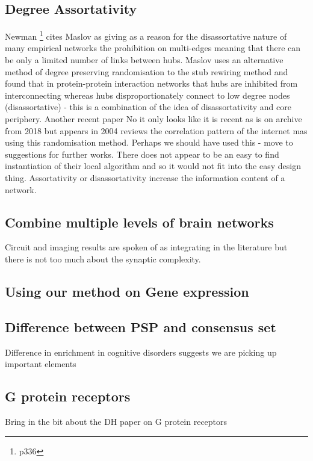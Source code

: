  	 \subsection{Degree Assortativity}
 
Newman \cite{newman2018networks}\footnote{p336} cites Maslov \cite{maslov2004detection} as giving as a reason for the disassortative nature of many empirical networks the prohibition on multi-edges meaning that there can be only a limited number of links between hubs. Maslov uses an alternative method of degree preserving randomisation to the stub rewiring method \cite{maslov2002specificity} and found that in protein-protein interaction networks that hubs are inhibited from interconnecting whereas hubs disproportionately connect to low degree nodes (disassortative) - this is a combination of the idea of disassortativity and core periphery. Another recent paper No it only looks like it is recent as is on archive from 2018 but appears in 2004 reviews the correlation pattern of the internet \cite{maslov2004detection} mas using this randomisation method. Perhaps we should have used this - move to suggestions for further works. There does not appear to be an easy to find instantiation of their local algorithm and so it would not fit into the easy design thing. 
Assortativity or disassortativity increase the information content of a network. 
 \subsection{Combine multiple levels of brain networks}
 Circuit and imaging results are spoken of as integrating in the literature but there is not too much about the synaptic complexity. 
 \subsection{Using our method on Gene expression}
 \label{sec:discussion using our method on gene expression}
 \subsection{Difference between PSP and consensus set}
 Difference in enrichment in cognitive disorders suggests we are picking up important elements
 
 \subsection{G protein receptors}
 Bring in the bit about the DH paper on G protein receptors
 
